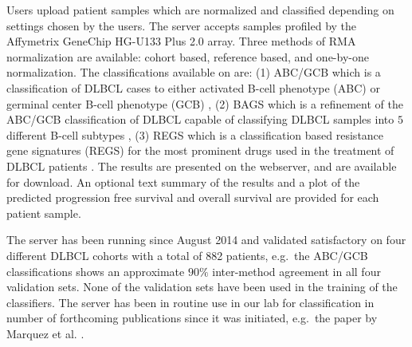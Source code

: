 Users upload patient samples which are normalized and classified depending on settings chosen by the users. 
The server accepts samples profiled by the Affymetrix GeneChip HG-U133 Plus 2.0 array. 
Three methods of RMA normalization are available: cohort based, reference based, and one-by-one normalization. 
The classifications available on \hemaClass{} are:
(1) ABC/GCB which is a classification of DLBCL cases to either activated B-cell phenotype (ABC) or germinal center B-cell phenotype (GCB) \cite{Alizadeh2000},
(2) BAGS which is a refinement of the ABC/GCB classification of DLBCL capable of classifying DLBCL samples into $5$ different B-cell subtypes \cite{DybkaerBoegsted2015},
(3) REGS which is a classification based resistance gene signatures (REGS) for the most prominent drugs used in the treatment of DLBCL patients \cite{Falgreen2015}.
The results are presented on the webserver, and are available for download. 
An optional text summary of the results and a plot of the predicted progression free survival and overall survival are provided for each patient sample.

The server has been running since August 2014 and validated satisfactory on four different DLBCL cohorts with a total of 882 patients, e.g.\ the ABC/GCB classifications shows an approximate $90 \%$ inter-method agreement in all four validation sets. 
None of the validation sets have been used in the training of the classifiers. 
The server has been in routine use in our lab for classification in number of forthcoming publications since it was initiated, e.g.\ the paper by Marquez et al. \cite{Marquez2015}.

\begingroup
\renewcommand{\section}[2]{}%


\endgroup



